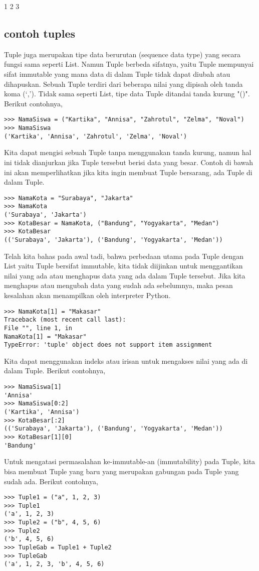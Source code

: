 1
2
3
\subsection {contoh tuples}
Tuple juga merupakan tipe data berurutan (sequence data type) yang secara fungsi sama seperti List. Namun Tuple berbeda sifatnya, yaitu Tuple mempunyai sifat immutable yang mana data di dalam Tuple tidak dapat diubah atau dihapuskan. Sebuah Tuple terdiri dari beberapa nilai yang dipisah oleh tanda koma (‘,’). Tidak sama seperti List, tipe data Tuple ditandai  tanda kurung "()". Berikut contohnya,
\begin{verbatim}
>>> NamaSiswa = ("Kartika", "Annisa", "Zahrotul", "Zelma", "Noval")
>>> NamaSiswa
('Kartika', 'Annisa', 'Zahrotul', 'Zelma', 'Noval')
\end{verbatim}

Kita dapat mengisi sebuah Tuple tanpa menggunakan tanda kurung, namun hal ini tidak dianjurkan jika Tuple tersebut berisi data yang besar. Contoh di bawah ini akan memperlihatkan jika kita ingin membuat Tuple bersarang, ada Tuple di dalam Tuple.
\begin{verbatim}
>>> NamaKota = "Surabaya", "Jakarta"
>>> NamaKota
('Surabaya', 'Jakarta')
>>> KotaBesar = NamaKota, ("Bandung", "Yogyakarta", "Medan")
>>> KotaBesar
(('Surabaya', 'Jakarta'), ('Bandung', 'Yogyakarta', 'Medan'))
\end{verbatim}

Telah kita bahas pada awal tadi, bahwa perbedaan utama pada Tuple dengan List yaitu Tuple bersifat immutable, kita tidak diijinkan untuk menggantikan nilai yang ada atau menghapus data yang ada dalam Tuple tersebut. Jika kita menghapus atau mengubah data yang sudah ada sebelumnya, maka pesan kesalahan akan menampilkan oleh interpreter Python.
\begin{verbatim}
>>> NamaKota[1] = "Makasar"
Traceback (most recent call last):
File "", line 1, in
NamaKota[1] = "Makasar"
TypeError: 'tuple' object does not support item assignment
\end{verbatim}

Kita dapat menggunakan indeks atau irisan untuk mengakses nilai yang ada di dalam Tuple. Berikut contohnya,
\begin{verbatim}
>>> NamaSiswa[1]
'Annisa'
>>> NamaSiswa[0:2]
('Kartika', 'Annisa')
>>> KotaBesar[:2]
(('Surabaya', 'Jakarta'), ('Bandung', 'Yogyakarta', 'Medan'))
>>> KotaBesar[1][0]
'Bandung'
\end{verbatim}

Untuk mengatasi permasalahan ke-immutable-an (immutability) pada Tuple, kita bisa membuat Tuple yang baru yang merupakan gabungan pada Tuple yang sudah ada. Berikut contohnya,
\begin{verbatim}
>>> Tuple1 = ("a", 1, 2, 3)
>>> Tuple1
('a', 1, 2, 3)
>>> Tuple2 = ("b", 4, 5, 6)
>>> Tuple2
('b', 4, 5, 6)
>>> TupleGab = Tuple1 + Tuple2
>>> TupleGab
('a', 1, 2, 3, 'b', 4, 5, 6)
\end{verbatim}

